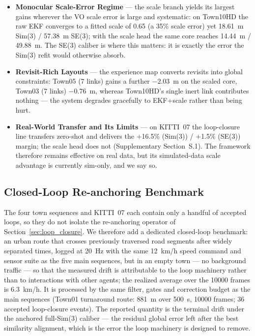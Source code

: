 \begin{itemize}
    \item \textbf{Monocular Scale-Error Regime} --- the scale branch yields its largest gains wherever the VO scale error is large and systematic: on Town10HD the raw EKF converges to a fitted scale of 0.65 (a 35\% scale error) yet 18.61~m Sim(3) / 57.38~m SE(3); with the scale head the same core reaches 14.44~m / 49.88~m. The SE(3) caliber is where this matters: it is exactly the error the Sim(3) refit would otherwise absorb.

    \item \textbf{Revisit-Rich Layouts} --- the experience map converts revisits into global constraints: Town05 (7 links) gains a further $-2.03$~m on the scaled core, Town03 (7 links) $-0.76$~m, whereas Town10HD's single inert link contributes nothing --- the system degrades gracefully to EKF+scale rather than being hurt.

    \item \textbf{Real-World Transfer and Its Limits} --- on KITTI~07 the loop-closure line transfers zero-shot and delivers the $+$16.5\% (Sim(3)) / $+$1.5\% (SE(3)) margin; the scale head does not (Supplementary Section~S.1). The framework therefore remains effective on real data, but its simulated-data scale advantage is currently sim-only, and we say so.
\end{itemize}

\subsection{Closed-Loop Re-anchoring Benchmark}
\label{sec:closed_loop}

The four town sequences and KITTI~07 each contain only a handful of accepted loops, so they do not isolate the re-anchoring operator of Section~\ref{sec:loop_closure}. We therefore add a dedicated closed-loop benchmark: an urban route that crosses previously traversed road segments after widely separated times, logged at 20~Hz with the same 12~km/h speed command and sensor suite as the five main sequences, but in an empty town --- no background traffic --- so that the measured drift is attributable to the loop machinery rather than to interactions with other agents; the realized average over the 10000 frames is 6.3~km/h. It is processed by the same filter, gates and correction budget as the main sequences (Town01 turnaround route: 881~m over 500~s, 10000 frames; 36 accepted loop-closure events). The reported quantity is the terminal drift under the anchored full-Sim(3) caliber --- the residual global error left after the best similarity alignment, which is the error the loop machinery is designed to remove.

